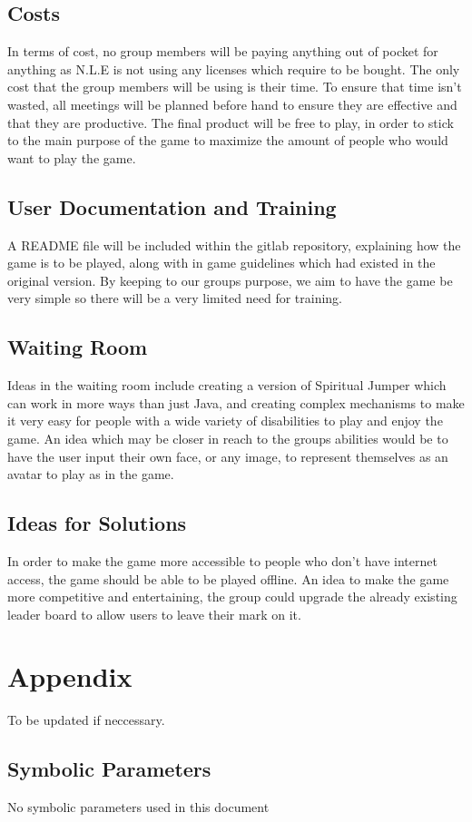 \documentclass[12pt, titlepage]{article}
\begin{document}
\subsection{Costs}

In terms of cost, no group members will be paying anything out of pocket for anything as N.L.E is not using any licenses which require to be bought. The only cost that the group members will be using is their time. To ensure that time isn't wasted, all meetings will be planned before hand to ensure they are effective and that they are productive. The final product will be free to play, in order to stick to the main purpose of the game to maximize the amount of people who would want to play the game.

\subsection{User Documentation and Training}

A README file will be included within the gitlab repository, explaining how the game is to be played, along with in game guidelines which had existed in the original version. By keeping to our groups purpose, we aim to have the game be very simple so there will be a very limited need for training. 

\subsection{Waiting Room}

Ideas in the waiting room include creating a version of Spiritual Jumper which can work in more ways than just Java, and creating complex mechanisms to make it very easy for people with a wide variety of disabilities to play and enjoy the game. An idea which may be closer in reach to the groups abilities would be to have the user input their own face, or any image, to represent themselves as an avatar to play as in the game.

\subsection{Ideas for Solutions}

In order to make the game more accessible to people who don't have internet access, the game should be able to be played offline. An idea to make the game more competitive and entertaining, the group could upgrade the already existing leader board to allow users to leave their mark on it. 





\newpage

\section{Appendix}

To be updated if neccessary.

\subsection{Symbolic Parameters}
No symbolic parameters used in this document
\end{document}
